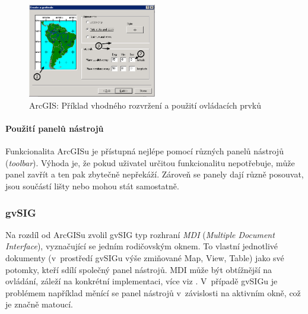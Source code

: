 \documentclass[a4paper,12pt,draft]{article}
\begin{document}
\begin{figure}[h!]
\centering
\includegraphics[width=0.5\textwidth]{./GUI_screenshots/ArcGIS_graticule_wizard.png}
\caption{ArcGIS: Příklad vhodného rozvržení a použití ovládacích
prvků}
\label{fig:ArcGIS_graticule_wizard}
\end{figure}

\paragraph*{Použití panelů nástrojů}
Funkcionalita ArcGISu je přístupná nejlépe pomocí různých panelů
nástrojů (\emph{toolbar}). Výhoda je, že pokud uživatel určitou
funkcionalitu nepotřebuje, může panel zavřít a ten pak zbytečně
nepřekáží. Zároveň se panely dají různě posouvat, jsou součástí
lišty nebo mohou stát samostatně.






\subsubsection{gvSIG}
Na rozdíl od ArcGISu zvolil gvSIG typ rozhraní \emph{MDI} (\emph{Multiple
Document Interface}),  vyznačující se jedním rodičovským oknem. To vlastní
jednotlivé dokumenty (v~prostředí gvSIGu výše zmiňované Map, View, Table) jako
své potomky, kteří sdílí společný panel nástrojů. MDI může být obtížnější na
ovládání, záleží na konkrétní implementaci, více viz \cite{wiki_MDI}. V~případě
gvSIGu je problémem například  měnící se panel nástrojů v~závislosti na aktivním
okně, což je značně matoucí.
\end{document}
